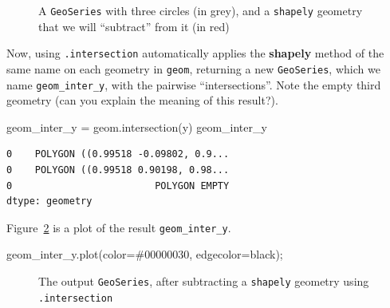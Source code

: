 \documentclass[
  letterpaper,
]{krantz}
\newenvironment{Shaded}{\begin{snugshade}}{\end{snugshade}}
\newcommand{\NormalTok}[1]{\textcolor[rgb]{0.00,0.23,0.31}{#1}}
\newcommand{\OperatorTok}[1]{\textcolor[rgb]{0.37,0.37,0.37}{#1}}
\newcommand{\StringTok}[1]{\textcolor[rgb]{0.13,0.47,0.30}{#1}}
\begin{document}
\begin{figure}[H]


\caption{\label{fig-geom-intersection}A \texttt{GeoSeries} with three
circles (in grey), and a \texttt{shapely} geometry that we will
``subtract'' from it (in red)}

\end{figure}%

Now, using \texttt{.intersection} automatically applies the
\textbf{shapely} method of the same name on each geometry in
\texttt{geom}, returning a new \texttt{GeoSeries}, which we name
\texttt{geom\_inter\_y}, with the pairwise ``intersections''. Note the
empty third geometry (can you explain the meaning of this result?).

\begin{Shaded}
\begin{Highlighting}[]
\NormalTok{geom\_inter\_y }\OperatorTok{=}\NormalTok{ geom.intersection(y)}
\NormalTok{geom\_inter\_y}
\end{Highlighting}
\end{Shaded}

\begin{verbatim}
0    POLYGON ((0.99518 -0.09802, 0.9...
0    POLYGON ((0.99518 0.90198, 0.98...
0                         POLYGON EMPTY
dtype: geometry
\end{verbatim}

Figure~\ref{fig-geom-intersection2} is a plot of the result
\texttt{geom\_inter\_y}.

\begin{Shaded}
\begin{Highlighting}[]
\NormalTok{geom\_inter\_y.plot(color}\OperatorTok{=}\StringTok{\textquotesingle{}\#00000030\textquotesingle{}}\NormalTok{, edgecolor}\OperatorTok{=}\StringTok{\textquotesingle{}black\textquotesingle{}}\NormalTok{)}\OperatorTok{;}
\end{Highlighting}
\end{Shaded}

\begin{figure}[H]


\caption{\label{fig-geom-intersection2}The output \texttt{GeoSeries},
after subtracting a \texttt{shapely} geometry using
\texttt{.intersection}}

\end{figure}%
\end{document}

